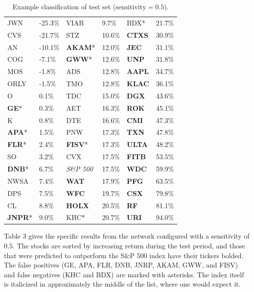 \documentclass[format=acmlarge]{acmart}
\begin{document}
\begin{table}
  \caption{Example classification of test set ($\textrm{sensitivity} = 0.5$).}
  \label{tab:three}
  \begin{tabular}{ll|ll|ll}
    JWN & -25.3\% & VIAB & 9.7\% & BDX* & 21.7\%\\
    CVS & -21.7\% & STZ & 10.6\% & \textbf{CTXS} & 30.9\%\\
    AN & -10.1\% & \textbf{AKAM}* & 12.0\% & \textbf{JEC} & 31.1\%\\
    COG & -7.1\% & \textbf{GWW}* & 12.6\% & \textbf{UNP} & 31.8\%\\
    MOS & -1.8\% & ADS & 12.8\% & \textbf{AAPL} & 34.7\%\\
    ORLY & -1.5\% & TMO & 12.8\% & \textbf{KLAC} & 36.1\%\\
    O & 0.1\% & TDC & 15.0\% & \textbf{DGX} & 43.6\%\\
    \textbf{GE}* & 0.3\% & AET & 16.3\% & \textbf{ROK} & 45.1\%\\
    K & 0.8\% & DTE & 16.6\% & \textbf{CMI} & 47.3\%\\
    \textbf{APA}* & 1.5\% & PNW & 17.3\% & \textbf{TXN} & 47.8\%\\
    \textbf{FLR}* & 2.4\% & \textbf{FISV}* & 17.3\% & \textbf{ULTA} & 48.2\%\\
    SO & 3.2\% & CVX & 17.5\% & \textbf{FITB} & 53.5\%\\
    \textbf{DNB}* & 6.7\% & \textit{S\&P 500} & 17.5\% & \textbf{WDC} & 59.9\%\\
    NWSA & 7.4\% & \textbf{WAT} & 17.9\% & \textbf{PFG} & 63.5\%\\
    DPS & 7.5\% & \textbf{WFC} & 19.7\% & \textbf{CSX} & 79.8\%\\
    CL & 8.8\% & \textbf{HOLX} & 20.5\% & \textbf{RF} & 81.1\%\\
    \textbf{JNPR}* & 9.0\% & KHC* & 20.7\% & \textbf{URI} & 94.0\%\\
  \end{tabular}
\end{table}

Table 3 gives the specific results from the network configured with a sensitivity of $0.5$.  The stocks are sorted by increasing return during the test period, and those that were predicted to outperform the S\&P 500 index have their tickers bolded.  The false positives (GE, APA, FLR, DNB, JNRP, AKAM, GWW, and FISV) and false negatives (KHC and BDX) are marked with asterisks.  The index itself is italicized in approximately the middle of the list, where one would expect it.
\end{document}
